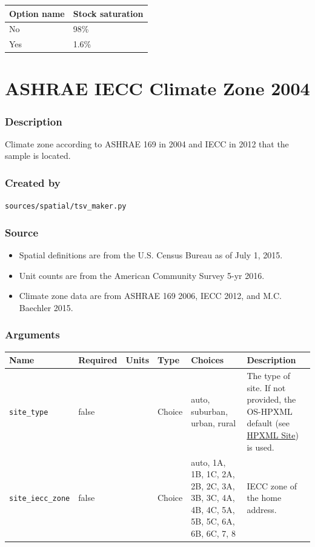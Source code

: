 \begin{longtable}[]{@{}ll@{}}
\toprule\noalign{}
Option name & Stock saturation \\
\midrule\noalign{}
\endhead
\bottomrule\noalign{}
\endlastfoot
No & 98\% \\
Yes & 1.6\% \\
\end{longtable}

\section{ASHRAE IECC Climate Zone
2004}\label{ashrae_iecc_climate_zone_2004}

\subsubsection{Description}\label{description-2}

Climate zone according to ASHRAE 169 in 2004 and IECC in 2012 that the
sample is located.

\subsubsection{Created by}\label{created-by-2}

\texttt{sources/spatial/tsv\_maker.py}

\subsubsection{Source}\label{source-2}

\begin{itemize}
 
\item
  Spatial definitions are from the U.S. Census Bureau as of July 1,
  2015.
\item
  Unit counts are from the American Community Survey 5-yr 2016.
\item
  Climate zone data are from ASHRAE 169 2006, IECC 2012, and M.C.
  Baechler 2015.
\end{itemize}

\subsubsection{Arguments}\label{arguments}

\begin{longtable}[]{@{}llllll@{}}
\toprule\noalign{}
Name & Required & Units & Type & Choices & Description \\
\midrule\noalign{}
\endhead
\bottomrule\noalign{}
\endlastfoot
\texttt{site\_type} & false & & Choice & auto, suburban, urban, rural &
The type of site. If not provided, the OS-HPXML default (see
\href{https://openstudio-hpxml.readthedocs.io/en/v1.7.0/workflow_inputs.html\#hpxml-site}{HPXML
Site}) is used. \\
\texttt{site\_iecc\_zone} & false & & Choice & auto, 1A, 1B, 1C, 2A, 2B,
2C, 3A, 3B, 3C, 4A, 4B, 4C, 5A, 5B, 5C, 6A, 6B, 6C, 7, 8 & IECC zone of
the home address. \\
\end{longtable}

